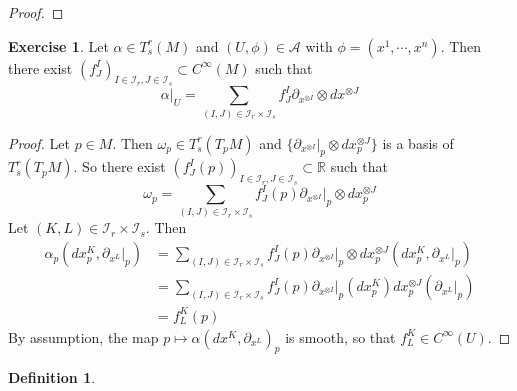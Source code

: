 \documentclass{book}
\theoremstyle{definition}
\newtheorem{defn}[definition]{Definition}
\newtheorem{ex}[definition]{Exercise}
\newcommand{\al}{\alpha}
\newcommand{\om}{\omega}
\newcommand{\R}{\mathbb{R}}
\newcommand{\MA}{\mathcal{A}}
\newcommand{\MI}{\mathcal{I}}
\DeclareMathOperator*{\0}{\mbf{0}}
\DeclareMathOperator*{\1}{\mbf{1}}
\begin{document}
	\begin{proof}
	
	\end{proof}
	
	\begin{ex}
		Let $\al \in T^r_s(M)$ and $(U, \phi) \in \MA$ with $\phi = (x^1, \cdots, x^n)$. Then there exist $(f^I_J)_{I \in \MI_r, J \in \MI_s} \subset C^{\infty}(M)$ such that $$\al|_U = \sum_{(I,J) \in \MI_r \times \MI_s} f^I_J \partial_{x^{\otimes I}} \otimes dx^{\otimes J}$$ 
	\end{ex}

	\begin{proof}
		Let $p \in M$. Then $\om_p \in T^r_s(T_pM)$ and $\bigg \{\partial_{x^{\otimes I}}|_p \otimes dx^{\otimes J}_p \bigg \}$ is a basis of $T^r_s(T_pM)$. So there exist $(f^I_J(p))_{I \in \MI_r, J \in \MI_s } \subset \R$ such that $$\om_p = \sum\limits_{(I,J) \in \MI_r \times \MI_s } f^I_J(p) \partial_{x^{\otimes I}}|_p \otimes dx^{\otimes J}_p $$
		Let $(K,L) \in \MI_r \times \MI_s$. Then 
		\begin{align*}
		\al_p(dx^K_p, \partial_{x^L}|_p) 
		&=  \sum\limits_{(I,J) \in \MI_r \times \MI_s } f^I_J(p) \partial_{x^{\otimes I}}|_p \otimes dx^{\otimes J}_p(dx^K_p, \partial_{x^L}|_p) \\
		&= \sum\limits_{(I,J) \in \MI_r \times \MI_s } f^I_J(p) \partial_{x^{\otimes I}}|_p (dx^K_p) dx^{\otimes J}_p(\partial_{x^L}|_p)  \\
		&= f^K_L(p)
		\end{align*}
		By assumption, the map $p \mapsto \al(dx^K, \partial_{x^L})_p$ is smooth, so that $f^K_L \in C^{\infty}(U)$.
	
	\end{proof}
	
	\begin{defn}
	
	\end{defn}	
	
	
	
	
	
	
	
	
	
	
	
	
	
	
	
	
	
	
	
	
	
	
	
	
	
	
	
	
	
\end{document}
